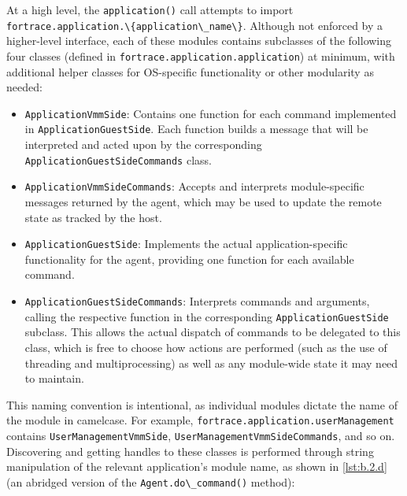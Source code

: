 \documentclass[letterpaper,12pt]{report}
\def\tightlist{}
\newcommand{\passthrough}[1]{#1}
\begin{document}
At a high level, the \passthrough{\lstinline!application()!} call
attempts to import
\passthrough{\lstinline!fortrace.application.\{application\_name\}!}.
Although not enforced by a higher-level interface, each of these modules
contains subclasses of the following four classes (defined in
\passthrough{\lstinline!fortrace.application.application!}) at minimum,
with additional helper classes for OS-specific functionality or other
modularity as needed:

\begin{itemize}
\tightlist
\item
  \passthrough{\lstinline!ApplicationVmmSide!}: Contains one function
  for each command implemented in
  \passthrough{\lstinline!ApplicationGuestSide!}. Each function builds a
  message that will be interpreted and acted upon by the corresponding
  \passthrough{\lstinline!ApplicationGuestSideCommands!} class.
\item
  \passthrough{\lstinline!ApplicationVmmSideCommands!}: Accepts and
  interprets module-specific messages returned by the agent, which may
  be used to update the remote state as tracked by the host.
\item
  \passthrough{\lstinline!ApplicationGuestSide!}: Implements the actual
  application-specific functionality for the agent, providing one
  function for each available command.
\item
  \passthrough{\lstinline!ApplicationGuestSideCommands!}: Interprets
  commands and arguments, calling the respective function in the
  corresponding \passthrough{\lstinline!ApplicationGuestSide!} subclass.
  This allows the actual dispatch of commands to be delegated to this
  class, which is free to choose how actions are performed (such as the
  use of threading and multiprocessing) as well as any module-wide state
  it may need to maintain.
\end{itemize}

This naming convention is intentional, as individual modules dictate the
name of the module in camelcase. For example,
\passthrough{\lstinline!fortrace.application.userManagement!} contains
\passthrough{\lstinline!UserManagementVmmSide!},
\passthrough{\lstinline!UserManagementVmmSideCommands!}, and so on.
Discovering and getting handles to these classes is performed through
string manipulation of the relevant application's module name, as shown
in \autoref{lst:b.2.d} (an abridged version of the
\passthrough{\lstinline!Agent.do\_command()!} method):
\end{document}
